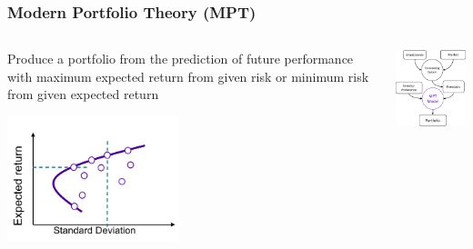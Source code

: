 \begin{frame}
\frametitle{Modern Portfolio Theory (MPT)}
\begin{columns}
\begin{column}{0.55\textwidth}
Produce a portfolio from the prediction of future performance with maximum expected return from given risk or minimum risk from given expected return
\begin{center}
\includegraphics[width=5cm]{images/efficient_frontier.png}
\end{center}
\end{column}
\begin{column}{0.45\textwidth}
\begin{center}
\includegraphics[width=4.8cm]{images/mpt.png}
\end{center}
\end{column}
\end{columns}
\end{frame}



